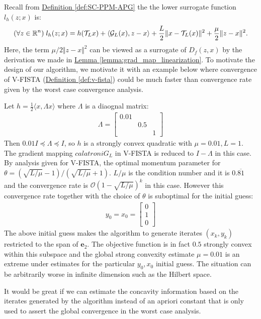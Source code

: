 \documentclass[12pt]{article}
\begin{document}
    \par\noindent
    Recall from 
    \hyperref[def:SC-PPM-APG]{Definition \ref*{def:SC-PPM-APG}}
    the the lower surrogate function $l_h(z; x)$ is: 
    \begin{align*}
        (\forall z \in \mathbb R^n) \; l_h(z; x) = h(\mathcal T_L x) + \langle \mathcal G_L (x), z - x\rangle
        + 
        \frac{L}{2}\Vert x - \mathcal T_L (x)\Vert^2 + \frac{\mu}{2}\Vert z - x\Vert^2. 
    \end{align*}
    Here, the term $\mu/2\Vert z - x\Vert^2$ can be viewed as a surrogate of $D_f(z, x)$ by the derivation we made in
    \hyperref[lemma:grad_map_linearization]{Lemma \ref*{lemma:grad_map_linearization}}. 
    To motivate the design of our algorithm, we motivate it with an example below where convergence of V-FISTA (\hyperref[def:v-fista]{Definition \ref*{def:v-fista}}) 
    could be much faster than convergence rate given by the worst case convergence analysis. 
    \begin{example}
        Let $h = \frac{1}{2}\langle x, \Lambda x\rangle$ where $\Lambda$ is a diaognal matrix: 
        \begin{align*}
            \Lambda = \begin{bmatrix}
                0.01 & & 
                \\
                & 0.5 & \\ 
                & & 1
            \end{bmatrix}
        \end{align*}
        Then $0.01 I \preceq \Lambda \preceq I$, so $h$ is a strongly convex quadratic with $\mu = 0.01, L = 1$. 
        The gradient mapping $calatroni G_L$ in V-FISTA is reduced to $I - \Lambda$ in this case. 
        By analysis given for V-FISTA, the optimal momentum parameter for $\theta = \left(\sqrt{L/\mu} - 1\right)/\left(\sqrt{L/\mu} + 1\right)$. 
        $L/\mu$ is the condition number and it is $0.\overline{81}$ and 
        the convergence rate is $\mathcal O\left(1 - \sqrt{L/\mu}\right)^k$ in this case. 
        However this convergence rate together with the choice of $\theta$ is suboptimal for the initial guess: 
        \begin{align*}
            y_0 = x_0 = \begin{bmatrix}
                0 \\ 1 \\ 0
            \end{bmatrix}
        \end{align*}
        The above initial guess makes the algorithm to generate iterates $(x_k, y_k)$ restricted to the span of $\mathbf e_2$. 
        The objective function is in fact $0.5$ strongly convex within this subspace and the global strong convexity estimate $\mu = 0.01$ is an extreme under estimates for the particular $y_0, x_0$ initial guess. 
        The situation can be arbitrarily worse in infinite dimension such as the Hilbert space. 
        
        It would be great if we can estimate the concavity information based on the iterates generated by the algorithm instead of an apriori constant that is only used to assert the global convergence in the worst case analysis. 
    \end{example}
\end{document}
